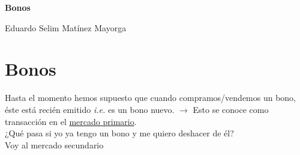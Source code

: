





\begin{titlingpage} %

    \raggedleft %
	
	\vspace*{\baselineskip} %
	
	\vspace*{0.25\textheight} %
	
    
    \vspace*{0.1\textheight}

    {\Huge{\textbf{Bonos}}}\\[\baselineskip] %
    \vspace*{0.1\textheight}

    
    {\Large Eduardo Selim Matínez Mayorga}\\[\baselineskip]
	
	\vfill

\end{titlingpage}

\thispagestyle{empty}

\chapter*{Bonos}
Hasta el momento hemos supuesto que cuando compramos/vendemos un bono, éste está recién emitido \textit{i.e.} es un bono nuevo. $\longrightarrow$ Esto se conoce como transacción en el \underline{mercado primario}.\\
¿Qué pasa si yo ya tengo un bono y me quiero deshacer de él?\\
Voy al mercado secundario\


